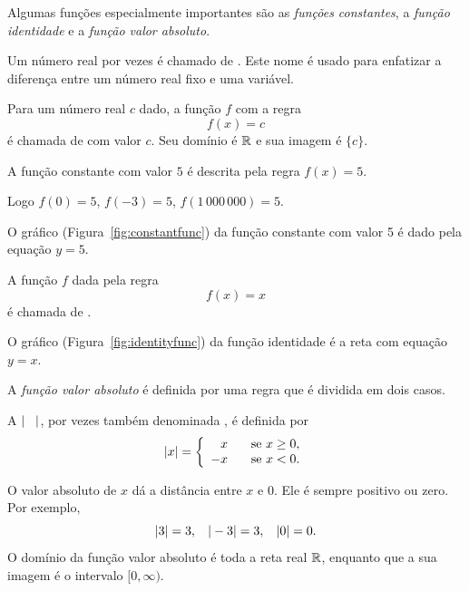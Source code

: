 
Algumas funções especialmente importantes são as \emph{funções
constantes}, a \emph{função identidade} e a \emph{função valor
absoluto}.

Um número real por vezes é chamado de . Este
nome é usado para enfatizar a diferença entre um número real
fixo e uma variável.

Para um número real $c$ dado, a função $f$ com a regra
\[
  f(x) = c
\]
é chamada de  com
valor $c$. Seu domínio é $\mathbb{R}$ e sua imagem é $\{c\}$.

\begin{example}
\label{ex:constantfunc}
A função constante com valor $5$ é descrita pela regra $f(x) = 5.$

Logo \SPC $f(0) = 5$, \SPC $f(-3) = 5$, \SPC $f(1\,000\,000) = 5$.

O gráfico (Figura~\ref{fig:constantfunc}) da função constante com
valor 5 é dado pela equação $y=5$.
\end{example}

\begin{example}
\label{ex:identityfunc}
A função $f$ dada pela regra
\[
  f(x) = x
\]
é chamada de .

O gráfico (Figura~\ref{fig:identityfunc}) da função identidade é a
reta com equação $y=x$.
\end{example}


A \emph{função valor absoluto} é definida por uma regra que é
dividida em dois casos.

\begin{defin}
A  $|\hspace{2ex}|$,
por vezes também denominada , é
definida por
\[
  |x| = \left\{
        \begin{array}{rl}
         x & \hspace{2ex} \text{se } x \ge 0,\\
        -x & \hspace{2ex} \text{se } x < 0.
        \end{array}
        \right.
\]
\end{defin}

O valor absoluto de $x$ dá a distância entre $x$ e $0$. Ele
é sempre positivo ou zero. Por exemplo,
\[
  |3| = 3, \hspace{2ex} |-3| = 3, \hspace{2ex} |0| = 0.
\]
O domínio da função valor absoluto é toda a reta real $\mathbb{R}$,
enquanto que a sua imagem é o intervalo $[0,\infty)$.

